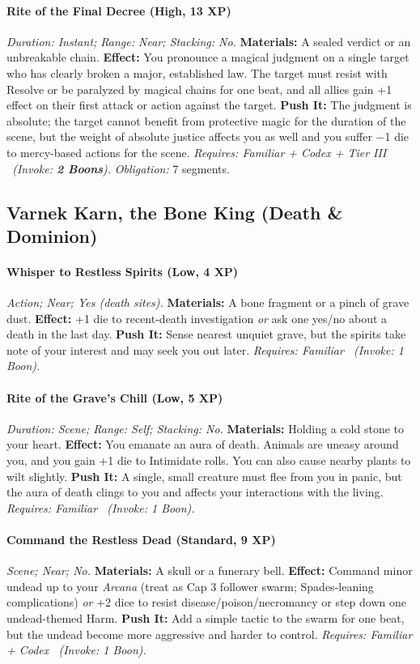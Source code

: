 \paragraph{Rite of the Final Decree (High, 13 XP)} \emph{Duration: Instant; Range: Near; Stacking: No.}
\textbf{Materials:} A sealed verdict or an unbreakable chain.
\textbf{Effect:} You pronounce a magical judgment on a single target who has clearly broken a major, established law. The target must resist with Resolve or be paralyzed by magical chains for one beat, and all allies gain +1 effect on their first attack or action against the target.
\textbf{Push It:} The judgment is absolute; the target cannot benefit from protective magic for the duration of the scene, but the weight of absolute justice affects you as well and you suffer −1 die to mercy-based actions for the scene.
\emph{Requires: Familiar + Codex + Tier III \ (\textit{Invoke:} \textbf{2 Boons}).}
\emph{Obligation:} 7 segments.

\subsection{Varnek Karn, the Bone King (Death \& Dominion)}
\paragraph{Whisper to Restless Spirits (Low, 4 XP)} \emph{Action; Near; Yes (death sites).}
\textbf{Materials:} A bone fragment or a pinch of grave dust.
\textbf{Effect:} +1 die to recent-death investigation \emph{or} ask one yes/no about a death in the last day.
\textbf{Push It:} Sense nearest unquiet grave, but the spirits take note of your interest and may seek you out later.
\emph{Requires: Familiar \ (\textit{Invoke:} 1 Boon).}
\paragraph{Rite of the Grave's Chill (Low, 5 XP)} \emph{Duration: Scene; Range: Self; Stacking: No.}
\textbf{Materials:} Holding a cold stone to your heart.
\textbf{Effect:} You emanate an aura of death. Animals are uneasy around you, and you gain +1 die to Intimidate rolls. You can also cause nearby plants to wilt slightly.
\textbf{Push It:} A single, small creature must flee from you in panic, but the aura of death clings to you and affects your interactions with the living.
\emph{Requires: Familiar \ (\textit{Invoke:} 1 Boon).}
\paragraph{Command the Restless Dead (Standard, 9 XP)} \emph{Scene; Near; No.}
\textbf{Materials:} A skull or a funerary bell.
\textbf{Effect:} Command minor undead up to your \emph{Arcana} (treat as Cap 3 follower swarm; Spades-leaning complications) \emph{or} +2 dice to resist disease/poison/necromancy or step down one undead-themed Harm.
\textbf{Push It:} Add a simple tactic to the swarm for one beat, but the undead become more aggressive and harder to control.
\emph{Requires: Familiar + Codex \ (\textit{Invoke:} 1 Boon).}
